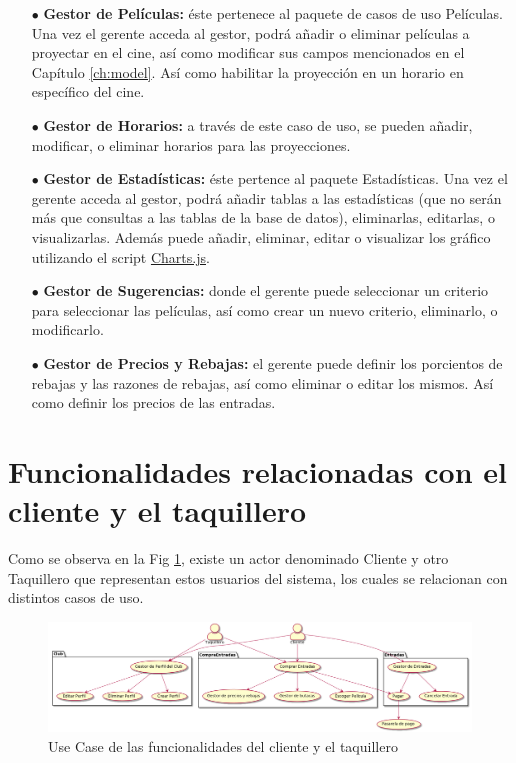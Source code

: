 \begin{enumerate}
    \item[$\bullet$] \textbf{Gestor de Películas:} éste pertenece al paquete de casos de uso Películas. Una vez el gerente acceda al gestor, podrá añadir o eliminar películas a proyectar en el cine, así como modificar sus campos mencionados en el Capítulo \ref{ch:model}. Así como habilitar la proyección en un horario en específico del cine.
    \item[$\bullet$] \textbf{Gestor de Horarios:} a través de este caso de uso, se pueden añadir, modificar, o eliminar horarios para las proyecciones.
    \item[$\bullet$] \textbf{Gestor de Estadísticas:} éste pertence al paquete Estadísticas. Una vez el gerente acceda al gestor, podrá añadir tablas a las estadísticas (que no serán más que consultas a las tablas de la base de datos), eliminarlas, editarlas, o visualizarlas. Además puede añadir, eliminar, editar o visualizar los gráfico utilizando el script \href{https://www.chartjs.org}{Charts.js}.
    \item[$\bullet$] \textbf{Gestor de Sugerencias:} donde el gerente puede seleccionar un criterio para seleccionar las películas, así como crear un nuevo criterio, eliminarlo, o modificarlo.
    \item[$\bullet$] \textbf{Gestor de Precios y Rebajas:} el gerente puede definir los porcientos de rebajas y las razones de rebajas, así como eliminar o editar los mismos. Así como definir los precios de las entradas. 
\end{enumerate}

\section{Funcionalidades relacionadas con el cliente y el taquillero}

Como se observa en la Fig \ref{fig:cltq}, existe un actor denominado Cliente y otro Taquillero que representan estos usuarios del sistema, los cuales se relacionan con distintos casos de uso.

\begin{figure}[h!]
    \centering
    \includegraphics[width=\linewidth]{./chapters/img/cliente-taquillero.png}
    
    \label{fig:cltq}
    \caption{Use Case de las funcionalidades del cliente y el taquillero}
\end{figure}

